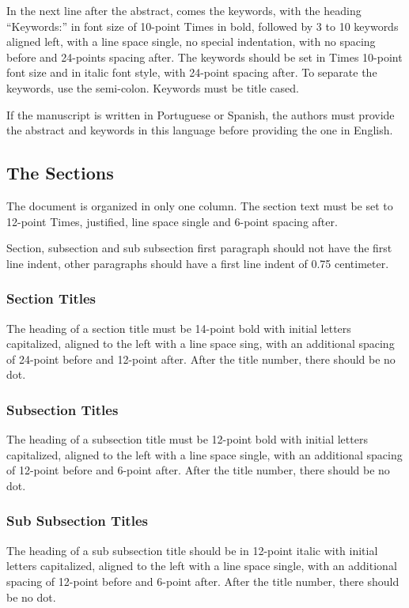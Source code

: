 \documentclass[english, spanish, brazilian]{RBIEarticle} %
\begin{document}
In the next line after the abstract, comes the keywords, with the heading ``Keywords:'' in font size of 10-point Times in bold, followed by 3 to 10 keywords aligned left, with a line space single, no special indentation, with no spacing before and 24-points spacing after. The keywords should be set in Times 10-point font size and in italic font style, with 24-point spacing after. To separate the keywords, use the semi-colon. Keywords must be title cased.

If the manuscript is written in Portuguese or Spanish, the authors must provide the abstract and keywords in this language before providing the one in English.


\subsection{The Sections}
The document is organized in only one column. The section text must be set to 12-point Times, justified, line space single and 6-point spacing after.

Section, subsection and sub subsection first paragraph should not have the first line indent, other paragraphs should have a first line indent of 0.75 centimeter.


\subsubsection{Section Titles}
The heading of a section title must be 14-point bold with initial letters capitalized, aligned to the left with a line space sing, with an additional spacing of 24-point before and 12-point after. After the title number, there should be no dot.


\subsubsection{Subsection Titles}
The heading of a subsection title must be 12-point bold with initial letters capitalized, aligned to the left with a line space single, with an additional spacing of 12-point before and 6-point after. After the title number, there should be no dot.


\subsubsection{Sub Subsection Titles}
The heading of a sub subsection title should be in 12-point italic with initial letters capitalized, aligned to the left with a line space single, with an additional spacing of 12-point before and 6-point after. After the title number, there should be no dot.
\end{document}
